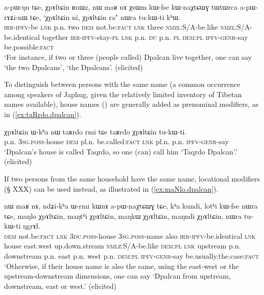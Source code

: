\begin{exe}
\ex \label{ex:Dpalcan.XsWm}
 \gll a-pɯ-ŋu tɕe, χpɤltɕin ʁnɯz, nɯ maʁ nɤ χsɯm kɯ-fse kɯ-naχtɕɯɣ tɯtɯrca a-pɯ-rɤʑi-nɯ tɕe, `χpɤltɕin ni, χpɤltɕin ra" nɯra tu-kɯ-ti kʰɯ. \\
 \textsc{irr}-\textsc{ipfv}-be \textsc{lnk} p.n. two \textsc{dem} not.be:\textsc{fact} \textsc{lnk} three \textsc{nmzl}:S/A-be.like \textsc{nmzl}:S/A-be.identical together \textsc{irr}-\textsc{ipfv}-stay-\textsc{pl} \textsc{lnk} p.n. \textsc{du} p.n. \textsc{pl} \textsc{dem}:\textsc{pl} \textsc{ipfv}-\textsc{genr}-say be.possible:\textsc{fact} \\ 
 \glt `For instance, if two or three (people called) Dpalcan live together, one can say `the two Dpalcans', `the Dpalcans'. (elicited)
\end{exe}

To distinguish between persons with the same name (a common occurrence among speakers of Japhug, given the relatively limited inventory of Tibetan names available), house names () are generally added as prenominal modifiers, as in (\ref{ex:taRrdo.dpalcan}).

\begin{exe}
\ex \label{ex:taRrdo.dpalcan}
\gll χpɤltɕin ɯ-kʰa nɯ taʁrdo rmi tɕe taʁrdo χpɤltɕin tu-kɯ-ti. \\
p.n. \textsc{3sg}.\textsc{poss}-house \textsc{dem} pl.n. be.called:\textsc{fact} \textsc{lnk} pl.n. p.n. \textsc{ipfv}-\textsc{genr}-say \\
\glt `Dpalcan's house is called Taqrdo, so one (can) call him `Taqrdo Dpalcan'.' (elicited)
\end{exe}

If  two persons from the same household have the same name, locational modifiers (§ XXX) can be used instead, as illustrated in (\ref{ex:maNlo.dpalcan}).

\begin{exe}
\ex \label{ex:maNlo.dpalcan}
\gll  nɯ maʁ nɤ, ndʑi-kʰa ɯ-rmi kɯnɤ a-pɯ-naχtɕɯɣ tɕe, kʰa kundi, lotʰi kɯ-fse nɯra tɕe,
maŋlo χpɤltɕin, maŋtʰi χpɤltɕin, maŋkɯ χpɤltɕin, maŋndi χpɤltɕin, nɯra tu-kɯ-ti ŋgrɤl. \\
\textsc{dem} not.be:\textsc{fact} \textsc{lnk} \textsc{3du}.\textsc{poss}-house \textsc{3sg}.\textsc{poss}-name also \textsc{irr}-\textsc{ipfv}-be.identical \textsc{lnk} house east.west up.down.stream \textsc{nmlz}:S/A-be.like \textsc{dem}:\textsc{pl} \textsc{lnk} upstream p.n. downstream p.n. east p.n. west p.n. \textsc{dem}:\textsc{pl} \textsc{ipfv}-\textsc{genr}-say be.usually.the.case:\textsc{fact} \\
\glt `Otherwise, if their house name is also the same, using the east-west or the upstream-downstream dimensions, one can say `Dpalcan from upstream, downstream, east or west.' (elicited)
\end{exe}

